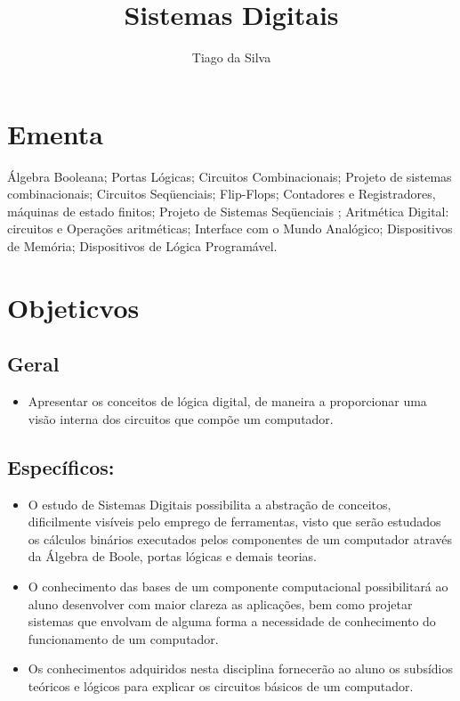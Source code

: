 \documentclass[12pt,consuni]{uftex2}
\title{Sistemas Digitais}
\author{Tiago da Silva}{Almeida}
\begin{document}
\maketitle

\chapter{Ementa}

Álgebra Booleana; Portas Lógicas; Circuitos Combinacionais; Projeto de sistemas combinacionais; Circuitos Seqüenciais; Flip-Flops; Contadores e Registradores, máquinas de estado finitos; Projeto de Sistemas Seqüenciais ; Aritmética Digital: circuitos e Operações aritméticas; Interface com o Mundo Analógico; Dispositivos de Memória; Dispositivos de Lógica Programável.

\chapter{Objeticvos}

\section{Geral}

\begin{itemize}
\item Apresentar os conceitos de lógica digital, de maneira a proporcionar uma visão interna dos circuitos que compõe um computador.
\end{itemize}

\section{Específicos:}

\begin{itemize}
\item O estudo de Sistemas Digitais possibilita a abstração de conceitos, dificilmente visíveis pelo emprego de ferramentas, visto que serão estudados os cálculos binários executados pelos componentes de um computador através da Álgebra de Boole, portas lógicas e demais teorias. 

\item O conhecimento das bases de um componente computacional possibilitará ao aluno desenvolver com maior clareza as aplicações, bem como projetar sistemas que envolvam de alguma forma a necessidade de conhecimento do funcionamento de um computador. 
\item Os conhecimentos adquiridos nesta disciplina fornecerão ao aluno os subsídios teóricos e lógicos para explicar os circuitos básicos de um computador.
\end{itemize}
\end{document}
